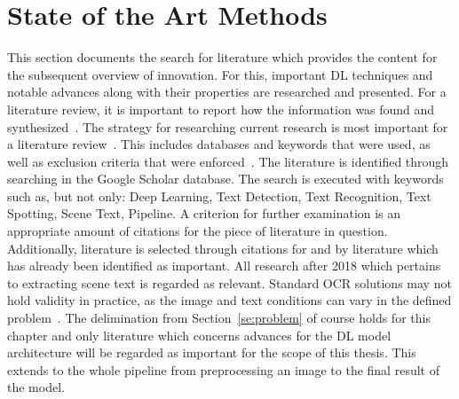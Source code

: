 \section{State of the Art Methods}
This section documents the search for literature which provides the content for the subsequent
overview of innovation.
For this, important \ac{DL} techniques and notable advances along with their properties are researched
and presented.
For a literature review, it is important to report how the information was found and
synthesized~\citep{torraco_writing_2005}.
The strategy for researching current research is most important for a literature
review~\citep{snyder_literature_2019}.
This includes databases and keywords that were used, as well as exclusion criteria that were
enforced~\citep{torraco_writing_2005}.
The literature is identified through searching in the Google Scholar database.
The search is executed with keywords such as, but not only: Deep Learning, Text Detection,
Text Recognition, Text Spotting, Scene Text, Pipeline.
A criterion for further examination is an appropriate amount of citations for the piece of literature
in question.
Additionally, literature is selected through citations for and by literature which has already been
identified as important.
All research after 2018 which pertains to extracting scene text is regarded as relevant.
Standard \ac{OCR} solutions may not hold validity in practice, as the image and text conditions can
vary in the defined problem~\citep{chen_text_2021}.
The delimination from Section~\ref{se:problem} of course holds for this chapter and only literature
which concerns advances for the \ac{DL} model architecture will be regarded as important for the
scope of this thesis.
This extends to the whole pipeline from preprocessing an image to the final result of the model.
